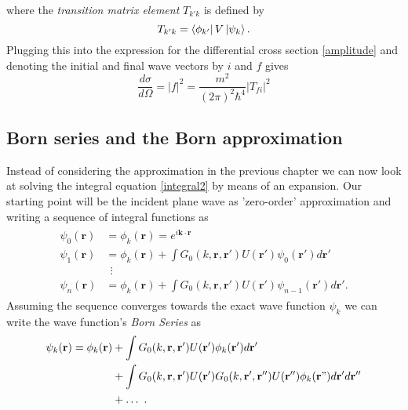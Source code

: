 \documentclass[11pt]{article}
\numberwithin{equation}{section}
\begin{document}
where the \emph{transition matrix element} $T_{k' k}$ is defined by
\begin{equation}\label{transitionmatrixelement}
	T_{k' k} = \bra{\phi_{k'}}V \ket{\psi_k}.
\end{equation}
Plugging this into the expression for the differential cross section \eqref{amplitude} and denoting the initial and final wave vectors by $i$ and $f$ gives
\begin{equation}
\frac{d\sigma}{d\Omega} = |f|^2 = \frac{m^2}{(2\pi)^2\hbar^4}	|T_{f i}|^2
\end{equation}





\subsection{Born series and the Born approximation}
Instead of considering the approximation in the previous chapter we can now look at solving the integral equation \eqref{integral2} by means of an expansion. Our starting point will be the incident plane wave as 'zero-order' approximation and writing a sequence of integral functions as
\begin{align}
\begin{split}
	\psi_0(\mathbf{r}) &= \phi_k(\mathbf{r}) = e^{i \mathbf{k \cdot r}}\\
	\psi_1(\mathbf{r}) &= \phi_k(\mathbf{r}) + \int	 G_0(k,\mathbf{r},\mathbf{r}')U(\mathbf{r}')\psi_0(\mathbf{r}')d\mathbf{r}' \\
	&~~\vdots\\
	\psi_n(\mathbf{r}) & = \phi_k(\mathbf{r}) + \int	 G_0(k,\mathbf{r},\mathbf{r}')U(\mathbf{r}')\psi_{n-1}(\mathbf{r}')d\mathbf{r}'.
\end{split}
\end{align}
Assuming the sequence converges towards the exact wave function $\psi_k$ we can write the wave function's \emph{Born Series} as 
\begin{align}
\begin{split}
	\psi_k(\mathbf{r}) = \phi_k(\mathbf{r}) &+ \int G_0(k,\mathbf{r},\mathbf{r}')U(\mathbf{r}')\phi_k(\mathbf{r}')d\mathbf{r}'\\
	&+ \int G_0(k,\mathbf{r},\mathbf{r}')U(\mathbf{r}')G_0(k,\mathbf{r}',\mathbf{r}'')U(\mathbf{r}'')\phi_k(\mathbf{r}")d\mathbf{r}'d\mathbf{r}''\\
	& + \ldots ~.
\end{split}
\end{align}
\end{document}

